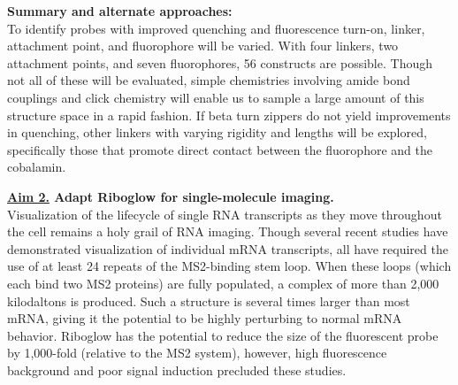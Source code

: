 \textbf{Summary and alternate approaches:}\\
To identify probes with improved quenching and fluorescence turn-on, linker, attachment point, and fluorophore will be varied. With four linkers, two attachment points, and seven fluorophores, 56 constructs are possible. Though not all of these will be evaluated, simple chemistries involving amide bond couplings and click chemistry will enable us to sample a large amount of this structure space in a rapid fashion. If beta turn zippers do not yield improvements in quenching, other linkers with varying rigidity and lengths will be explored\cite{LeeDesignSynthesisCharacterization2009}, specifically those that promote direct contact between the fluorophore and the cobalamin. 

\textbf{\underline{Aim 2.} Adapt Riboglow for single-molecule imaging.}\\
Visualization of the lifecycle of single RNA transcripts as they move throughout the cell remains a holy grail of RNA imaging. Though several recent studies have demonstrated visualization of individual mRNA transcripts, all have required the use of at least 24 repeats of the MS2-binding stem loop\cite{KatzMappingtranslationhotspots2016,FuscoSinglemRNAMolecules2003,YamagishiSinglemoleculeimagingvactin2009,HalsteadRNAbiosensorimaging2015}.
When these loops (which each bind two MS2 proteins) are fully populated, a complex of more than 2,000 kilodaltons is produced.
Such a structure is several times larger than most mRNA, giving it the potential to be highly perturbing to normal mRNA behavior.
Riboglow has the potential to reduce the size of the fluorescent probe by 1,000-fold (relative to the MS2 system), however, high fluorescence background and poor signal induction precluded these studies\cite{BraselmannDevelopmentriboswitchbasedplatform2017}.



